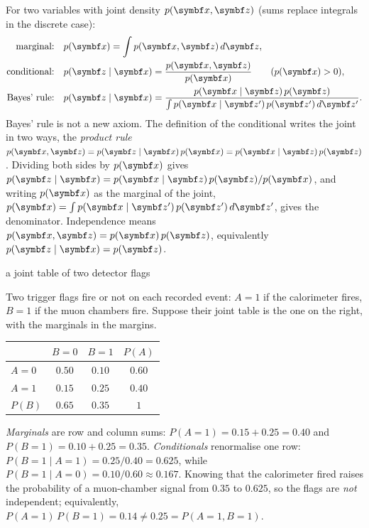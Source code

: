 \documentclass[11pt]{article}
\begin{document}
For two variables with joint density $p(\x, \vect{z})$ (sums replace integrals in the discrete case):
\begin{align*}
  \text{marginal:} \quad & p(\x) = \int p(\x, \vect{z})\, d\vect{z}, \\
  \text{conditional:} \quad & p(\vect{z} \mid \x) = \frac{p(\x, \vect{z})}{p(\x)} \qquad (p(\x) > 0), \\
  \text{Bayes' rule:} \quad & p(\vect{z} \mid \x) = \frac{p(\x \mid \vect{z})\, p(\vect{z})}{\int p(\x \mid \vect{z}')\, p(\vect{z}')\, d\vect{z}'} .
\end{align*}
Bayes' rule is not a new axiom. The definition of the conditional writes the joint in two ways, the \emph{product
rule} $p(\x, \vect{z}) = p(\vect{z} \mid \x)\,p(\x) = p(\x \mid \vect{z})\,p(\vect{z})$. Dividing both sides by $p(\x)$
gives $p(\vect{z} \mid \x) = p(\x \mid \vect{z})\,p(\vect{z})/p(\x)$, and writing $p(\x)$ as the marginal of the joint,
$p(\x) = \int p(\x \mid \vect{z}')\,p(\vect{z}')\,d\vect{z}'$, gives the denominator.
Independence means $p(\x, \vect{z}) = p(\x)\,p(\vect{z})$, equivalently $p(\vect{z} \mid \x) = p(\vect{z})$.

\begin{worked}{a joint table of two detector flags}
\begin{minipage}[c]{0.5\linewidth}
Two trigger flags fire or not on each recorded event: $A = 1$ if the calorimeter fires, $B = 1$ if the muon chambers
fire. Suppose their joint table is the one on the right, with the marginals in the margins.
\end{minipage}\hfill
\begin{minipage}[c]{0.46\linewidth}\centering\small
\begin{tabular}{@{}lccc@{}}\toprule
 & $B = 0$ & $B = 1$ & $P(A)$ \\ \midrule
$A = 0$ & $0.50$ & $0.10$ & $0.60$ \\
$A = 1$ & $0.15$ & $0.25$ & $0.40$ \\ \midrule
$P(B)$ & $0.65$ & $0.35$ & $1$ \\ \bottomrule
\end{tabular}
\end{minipage}\par\smallskip
\emph{Marginals} are row and column sums: $P(A = 1) = 0.15 + 0.25 = 0.40$ and $P(B = 1) = 0.10 + 0.25 = 0.35$.
\emph{Conditionals} renormalise one row: $P(B = 1 \mid A = 1) = 0.25 / 0.40 = 0.625$, while $P(B = 1 \mid A = 0) =
0.10/0.60 \approx 0.167$. Knowing that the calorimeter fired raises the probability of a muon-chamber signal from
$0.35$ to $0.625$, so the flags are \emph{not} independent; equivalently, $P(A = 1)\,P(B = 1) = 0.14 \ne 0.25 =
P(A = 1, B = 1)$.
\end{worked}
\end{document}
